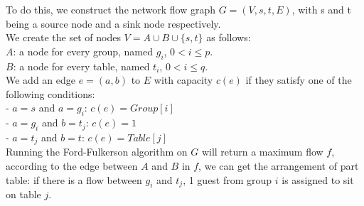 \documentclass[a4paper,11pt]{article}
\begin{document}
To do this, we construct the network flow graph $G=(V, s,t,E)$, with s and t being a source node and a sink node respectively. \\

We create the set of nodes $V= A\cup B\cup \{s, t\}$ as follows:\\
$A$: a node for every group, named $g_{i}$, $0<i\leq p$.\\
$B$: a node for every table, named $t_{i}$, $0<i\leq q$.\\

We add an edge $e=(a,b)$ to $E$ with capacity $c(e)$ if they satisfy one of the following conditions:\\
- $a=s$ and $a=g_{i}$: $c(e) = \textit{Group}[i]$\\
- $a=g_{i}$ and $b=t_{j}$: $c(e) = 1$\\
- $a=t_{j}$ and $b = t$: $c(e) = \textit{Table}[j]$\\

Running the Ford-Fulkerson algorithm on $G$ will return a maximum flow $f$, according to the edge between $A$ and $B$ in $f$, we can get the arrangement of part table: if there is a flow between $g_{i}$ and $t_{j}$, 1 guest from group $i$ is assigned to sit on table $j$.
\end{document}
